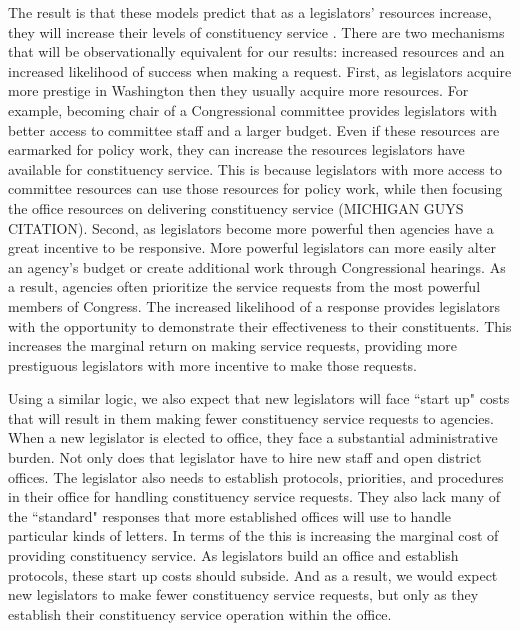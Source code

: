 \documentclass{article}
\begin{document}
The result is that these models predict that as a legislators' resources increase, they will increase their levels of constituency service \cite[Proposition 1]{AshworthBuenodeMesquita2006}.  There are two mechanisms that will be observationally equivalent for our results: increased resources and an increased likelihood of success when making a request.  First, as legislators acquire more prestige in Washington then they usually acquire more resources.  For example, becoming chair of a Congressional committee provides legislators with better access to committee staff and a larger budget.  Even if these resources are earmarked for policy work, they can increase the resources legislators have available for constituency service. This is because legislators with more access to committee resources can use those resources for policy work, while then focusing the office resources on delivering constituency service (MICHIGAN GUYS CITATION).  Second, as legislators become more powerful then agencies have a great incentive to be responsive.  More powerful legislators can more easily alter an agency's budget or create additional work through Congressional hearings.  As a result, agencies often prioritize the service requests from the most powerful members of Congress.  The increased likelihood of a response provides legislators with the opportunity to demonstrate their effectiveness to their constituents. This increases the marginal return on making service requests, providing more prestiguous legislators with more incentive to make those requests.   


Using a similar logic, we also expect that new legislators will face ``start up" costs that will result in them making fewer constituency service requests to agencies.  When a new legislator is elected to office, they face a substantial administrative burden.  Not only does that legislator have to hire new staff and open district offices.  The legislator also needs to establish protocols, priorities, and procedures in their office for handling constituency service requests.  They also lack many of the ``standard" responses that more established offices will use to handle particular kinds of letters. In terms of the \cite{AshworthBuenodeMesquita2006} this is increasing the marginal cost of providing constituency service.  As legislators build an office and establish protocols, these start up costs should subside.  And as a result, we would expect new legislators to make fewer constituency service requests, but only as they establish their constituency service operation within the office.    
\end{document}

